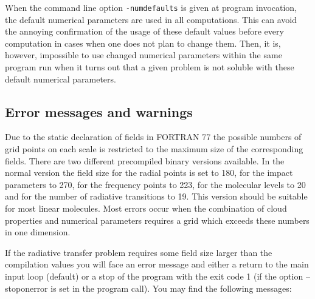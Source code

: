 When the command line option {\tt -numdefaults} is given at program 
invocation, the default numerical parameters are used in all computations.
This can avoid the annoying confirmation of the usage of these default
values before every computation in cases when one does not plan to change
them. Then, it is, however, impossible to use changed numerical
parameters within the same program run when it turns out that a
given problem is not soluble with these default numerical parameters.

\subsection{Error messages and warnings}
\label{warnings}

Due to the static declaration of fields in FORTRAN 77 the possible
numbers of grid points on each scale is restricted to the maximum
size of the corresponding fields. There are two different precompiled
binary versions available. In the normal version the field size for the
radial points is set to 180, for the impact parameters to 270,
for the frequency points to 223, for the molecular levels to
20 and for the number of radiative transitions to 19. This version
should be suitable for most linear molecules. Most errors occur
when the combination of cloud properties and numerical parameters
requires a grid which exceeds these numbers in one dimension.

If the radiative transfer problem requires some
field size larger than the compilation values you will face an error 
message and either a return to the main input loop (default)
or a stop of the program with the exit code 1 (if the
option --stoponerror is set in the program call).
You may find the following messages:


